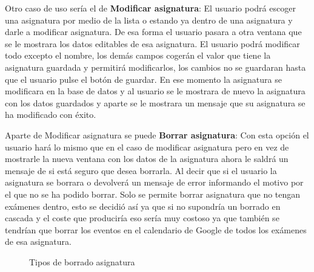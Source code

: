 Otro caso de uso sería el de \textbf{Modificar asignatura}:
El usuario podrá escoger una asignatura por medio de la lista o estando ya dentro de una asignatura y darle a modificar asignatura. De esa forma el usuario pasara a otra ventana que se le mostrara los datos editables de esa asignatura.
El usuario podrá modificar todo excepto el nombre, los demás campos cogerán el valor que tiene la asignatura guardada y permitirá modificarlos, los cambios no se guardaran hasta que el usuario pulse el botón de guardar.
En ese momento la asignatura se modificara en la base de datos y al usuario se le mostrara de nuevo la asignatura con los datos guardados y aparte se le mostrara un mensaje que su asignatura se ha modificado con éxito.

Aparte de Modificar asignatura se puede \textbf{Borrar asignatura}:
Con esta opción el usuario hará lo mismo que en el caso de modificar asignatura pero en vez de mostrarle la nueva ventana con los datos de la asignatura ahora le saldrá un mensaje de si está seguro que desea borrarla. 
Al decir que si el usuario la asignatura se borrara o devolverá un mensaje de error informando el motivo por el que no se ha podido borrar.
Solo se permite borrar asignatura que no tengan exámenes dentro, esto se decidió así ya que si no supondría un borrado en cascada y el coste que produciría eso sería muy costoso ya que también se tendrían que borrar los eventos en el calendario de Google de todos los exámenes de esa asignatura.

\begin{figure}[H]
 \centering
 \caption{Tipos de borrado asignatura}
 \label{f:Tipos de borrado asignatura}
\end{figure}

